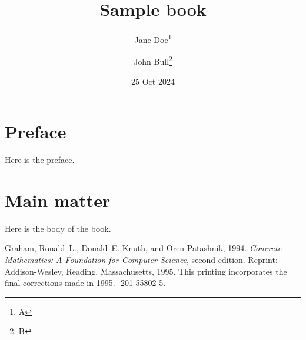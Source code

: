 \documentclass{book}
\title{Sample book}
\author{Jane Doe\thanks{A} \and John Bull\thanks{B}}
\date{25 Oct 2024}
\begin{document}

\frontmatter

\maketitle

\tableofcontents

\chapter*{Preface}

Here is the preface.

\mainmatter

\chapter{Main matter}

Here is the body of the book.

\begin{thebibliography}{9}

Graham, Ronald~L., Donald~E. Knuth, and Oren Patashnik, 1994.
\newblock \emph{Concrete Mathematics: A Foundation for Computer Science},
  second edition.
\newblock Reprint: Addison-Wesley, Reading, Massachusetts, 1995.
\newblock This printing incorporates the final corrections made in 1995.
-201-55802-5.

\end{thebibliography}
\end{document}
